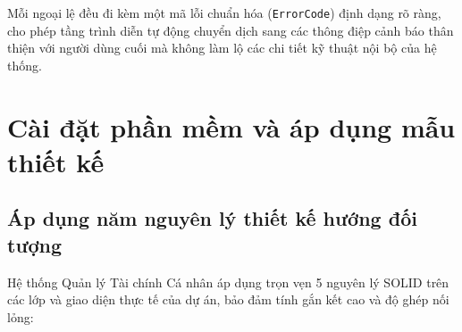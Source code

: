\documentclass[a4paper,12pt]{report}
\newcommand{\passthrough}[1]{#1}
\begin{document}
Mỗi ngoại lệ đều đi kèm một mã lỗi chuẩn hóa
(\passthrough{\lstinline!ErrorCode!}) định dạng rõ ràng, cho phép tầng
trình diễn tự động chuyển dịch sang các thông điệp cảnh báo thân thiện
với người dùng cuối mà không làm lộ các chi tiết kỹ thuật nội bộ của hệ
thống.

\chapter{Cài đặt phần mềm và áp dụng mẫu thiết
kế}\label{cuxe0i-ux111ux1eb7t-phux1ea7n-mux1ec1m-vuxe0-uxe1p-dux1ee5ng-mux1eabu-thiux1ebft-kux1ebf}

\section{Áp dụng năm nguyên lý thiết kế hướng đối
tượng}\label{uxe1p-dux1ee5ng-nux103m-nguyuxean-luxfd-thiux1ebft-kux1ebf-hux1b0ux1edbng-ux111ux1ed1i-tux1b0ux1ee3ng}

Hệ thống Quản lý Tài chính Cá nhân áp dụng trọn vẹn 5 nguyên lý SOLID
trên các lớp và giao diện thực tế của dự án, bảo đảm tính gắn kết cao và
độ ghép nối lỏng:
\end{document}
